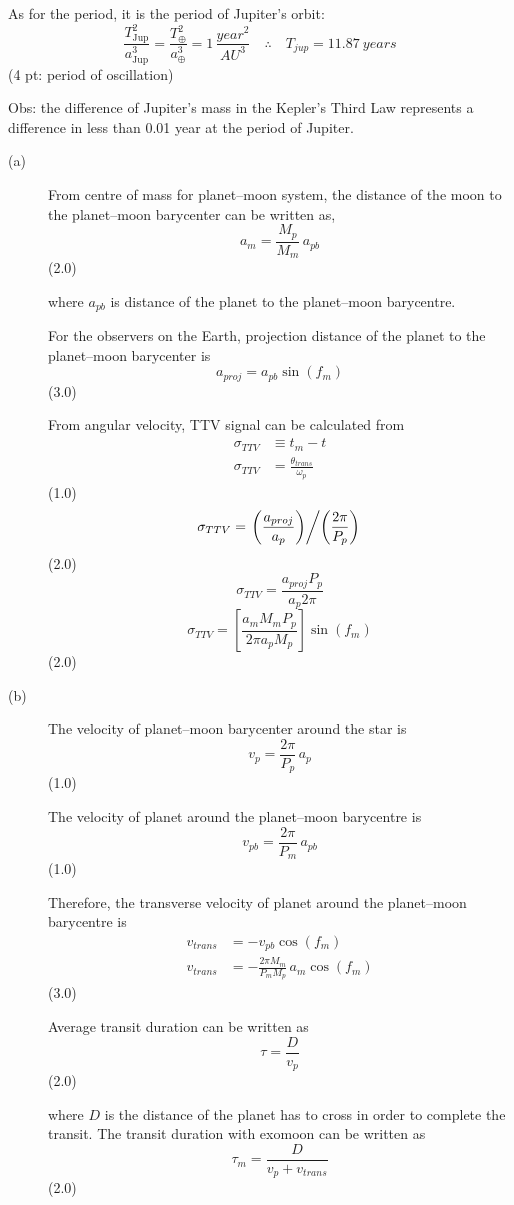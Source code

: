 As for the period, it is the period of Jupiter's orbit:
\[ \frac{T_{\mathrm{Jup}}^2}{a_{\mathrm{Jup}}^3} = \frac{T_\oplus^2}{a_\oplus^3}
   = 1\,\frac{year^2}{AU^3}
   \quad\therefore\quad T_{jup} = 11.87\ years \]
\hfill(4 pt: period of oscillation)

Obs: the difference of Jupiter's mass in the Kepler's Third Law represents a
difference in less than 0.01 year at the period of Jupiter.

\begin{description}
\item[(a)] From centre of mass for planet--moon system, the distance of the
moon to the planet--moon barycenter can be written as,
\[ a_m = \frac{M_p}{M_m}\,a_{pb} \]
\hfill(2.0)

where $a_{pb}$ is distance of the planet to the planet--moon barycentre.

For the observers on the Earth, projection distance of the planet to the
planet--moon barycenter is
\[ a_{proj} = a_{pb}\sin(f_m) \]
\hfill(3.0)

From angular velocity, TTV signal can be calculated from
\begin{align*}
\sigma_{TTV} &\equiv t_m - t\\
\sigma_{TTV} &= \frac{\theta_{trans}}{\omega_p}
\end{align*}
\hfill(1.0)
\[ \sigma_{TTV} = \left.\left(\frac{a_{proj}}{a_p}\right)\middle/
   \left(\frac{2\pi}{P_p}\right)\right. \]
\hfill(2.0)
\[ \sigma_{TTV} = \frac{a_{proj}P_p}{a_p 2\pi} \]
\[ \sigma_{TTV} = \left[\frac{a_m M_m P_p}{2\pi a_p M_p}\right]\sin(f_m) \]
\hfill(2.0)

\item[(b)] The velocity of planet--moon barycenter around the star is
\[ v_p = \frac{2\pi}{P_p}\,a_p \]
\hfill(1.0)

The velocity of planet around the planet--moon barycentre is
\[ v_{pb} = \frac{2\pi}{P_m}\,a_{pb} \]
\hfill(1.0)

Therefore, the transverse velocity of planet around the planet--moon
barycentre is
\begin{align*}
v_{trans} &= -v_{pb}\cos(f_m)\\
v_{trans} &= -\frac{2\pi M_m}{P_m M_p}\,a_m\cos(f_m)
\end{align*}
\hfill(3.0)

Average transit duration can be written as
\[ \tau = \frac{D}{v_p} \]
\hfill(2.0)

where $D$ is the distance of the planet has to cross in order to complete the
transit. The transit duration with exomoon can be written as
\[ \tau_m = \frac{D}{v_p + v_{trans}} \]
\hfill(2.0)


\end{description}
